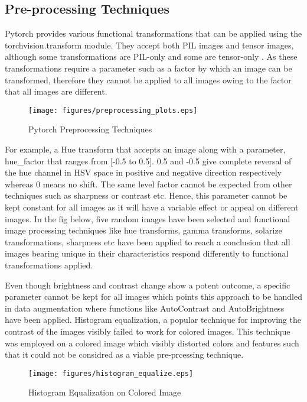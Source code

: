 \documentclass[conference]{IEEEtran}
\begin{document}
\subsection{Pre-processing Techniques}
Pytorch provides various functional transformations that can be applied using the torchvision.transform module. They accept both PIL images and tensor images, although some transformations are PIL-only and some are tensor-only \cite{17}. As these transformations require a parameter such as a factor by which an image can be transformed, therefore they cannot be applied to all images owing to the factor that all images are different.

\begin{figure}[htbp]
    \texttt{[image: figures/preprocessing\_plots.eps]}
    \caption{Pytorch Preprocessing Techniques}
    \label{fig}
    \end{figure}

For example, a Hue transform that accepts an image along with a parameter, hue\_factor that ranges from [-0.5 to 0.5]. 0.5 and -0.5 give complete reversal of the hue channel in HSV space in positive and negative direction respectively whereas 0 means no shift. The same level factor cannot be expected from other techniques such as sharpness or contrast etc. Hence, this parameter cannot be kept constant for all images as it will have a variable effect or appeal on different images. In the fig below, five random images have been selected and functional image processing techniques like hue transforms, gamma transforms, solarize transformations, sharpness etc have been applied to reach a conclusion that all images bearing unique in their characteristics respond differently to functional transformations applied.

Even though brightness and contrast change show a potent outcome, a specific parameter cannot be kept for all images which points this approach to be handled in data augmentation where functions like AutoContrast and AutoBrightness have been applied. Histogram equalization, a popular technique for improving the contrast of the images visibly failed to work for colored images. This technique was employed on a colored image which visibly distorted colors and features such that it could not be considred as a viable pre-prcessing technique.

\begin{figure}[htbp] 
    \texttt{[image: figures/histogram\_equalize.eps]} 
    \caption{Histogram Equalization on Colored Image} 
    \label{fig} 
    \end{figure}
\end{document}
